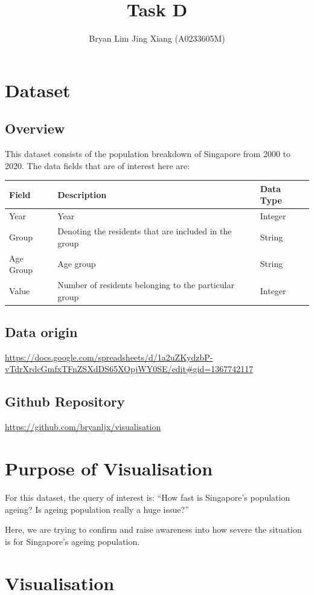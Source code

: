 \documentclass[a4paper, 11pt]{article}
\author{Bryan Lim Jing Xiang (A0233605M)}
\date{}
\title{Task D}
\begin{document}
\maketitle
\section{Dataset}
\label{sec:orge4a0c34}
\subsection{Overview}
\label{sec:org3217a13}
This dataset consists of the population breakdown of Singapore from 2000 to 2020. The data fields that are of interest here are:

\begin{center}
\begin{tabular}{lll}
Field & Description & Data Type\\[0pt]
\hline
Year & Year & Integer\\[0pt]
Group & Denoting the residents that are included in the group & String\\[0pt]
Age Group & Age group & String\\[0pt]
Value & Number of residents belonging to the particular group & Integer\\[0pt]
\end{tabular}
\end{center}
\subsection{Data origin}
\label{sec:org325629d}
\url{https://docs.google.com/spreadsheets/d/1a2uZKydzbP-vTdrXrdcGmfxTFnZSXdDS65XOpjWY0SE/edit\#gid=1367742117}
\subsection{Github Repository}
\label{sec:orgb938dcd}
\url{https://github.com/bryanljx/visualisation}
\section{Purpose of Visualisation}
\label{sec:org9c44940}
For this dataset, the query of interest is: ``How fast is Singapore's population ageing? Is ageing population really a huge issue?''

Here, we are trying to confirm and raise awareness into how severe the situation is for Singapore's ageing population.
\section{Visualisation}
\label{sec:org0658aff}
\end{document}
